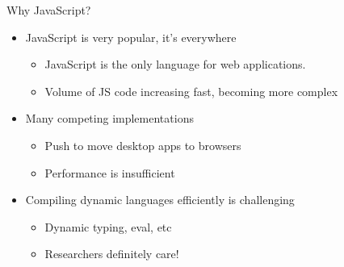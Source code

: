 \begin{frame}{Why JavaScript?}
    \begin{itemize}
        \item JavaScript is very popular, it's everywhere
        \begin{itemize}
            \item JavaScript is the only language for web applications.
            \item Volume of JS code increasing fast, becoming more complex
        \end{itemize}

        \item Many competing implementations
        \begin{itemize}
            \item Push to move desktop apps to browsers
            \item Performance is insufficient
        \end{itemize}
        
        \item Compiling dynamic languages efficiently is challenging
        \begin{itemize}
            \item Dynamic typing, eval, etc
            \item Researchers definitely care!
        \end{itemize}
    \end{itemize}
\end{frame}

